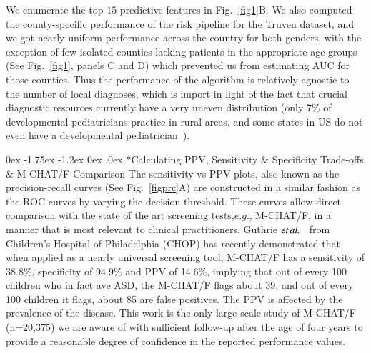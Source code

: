 \documentclass[onecolumn, compsoc,11pt]{IEEEtran}
\makeatletter
\renewcommand\subsection{\@startsection {subsection}{2}{\z@}%
                                   {0ex \@plus -1.75ex \@minus -1.2ex}%
                                   {0ex \@plus.0ex}%
                                   {\fontsize{11}{11}\selectfont\bfseries\sffamily\color{black}}}
\makeatother
\begin{document}
We enumerate the top $15$ predictive features in Fig.~\ref{fig1}B. 
We also computed the county-specific performance of the risk pipeline for the Truven dataset, and we got nearly uniform performance across the country for both genders, with the exception of  few isolated counties lacking patients in the appropriate age groups (See Fig.~\ref{fig1}, panels C and D) which prevented us from estimating AUC for those counties. Thus the performance of the algorithm is relatively agnostic to the number of local diagnoses, which is import in light of the fact that   crucial diagnostic resources currently have a very uneven distribution (only 7\% of developmental pediatricians practice in rural areas, and some states in US do not even have a developmental pediatrician~\cite{gordon2016whittling,althouse2006pediatric}).


\subsection*{Calculating PPV, Sensitivity \& Specificity Trade-offs \& M-CHAT/F Comparison}
The sensitivity vs PPV plots, also known as the precision-recall curves (See Fig.~\ref{figprc}A) are constructed in a similar fashion as the ROC curves by varying the decision threshold. These curves  allow direct comparison with the  state of the art screening tests,$e.g.$, M-CHAT/F, in a manner that is most relevant to clinical practitioners.
%
Guthrie $\textit{et} \mspace{3mu} \textit{al.}$~\cite{pmid31562252} from Children's Hospital of Philadelphia (CHOP) has recently demonstrated that when applied as a nearly universal screening tool, M-CHAT/F has a sensitivity of 38.8\%, specificity of 94.9\% and PPV of 14.6\%, implying that out of every 100 children who in fact ave ASD, the M-CHAT/F flags about 39, and out of every 100 children it flags, about 85 are false positives. The PPV is affected by the prevalence of the disease. This work is the only large-scale study of M-CHAT/F (n=20,375) we are aware of with sufficient follow-up after the age of four years to provide a reasonable degree of confidence in the reported performance values.
\end{document}
